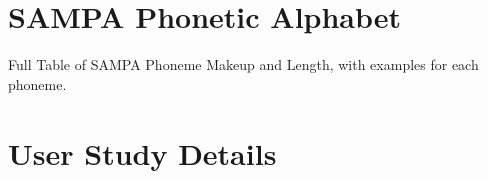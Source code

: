 \chapter{SAMPA Phonetic Alphabet}
\label{appendix:table:sampaTable}
\begin{table}
\caption[Table of SAMPA Phoneme Makeup and Length]{Full Table of SAMPA Phoneme Makeup and Length, with examples for each phoneme.}
\end{table}



\chapter{User Study Details}
\label{appendix:UserStudyDetails}



\label{table:phrasesRecorded}

